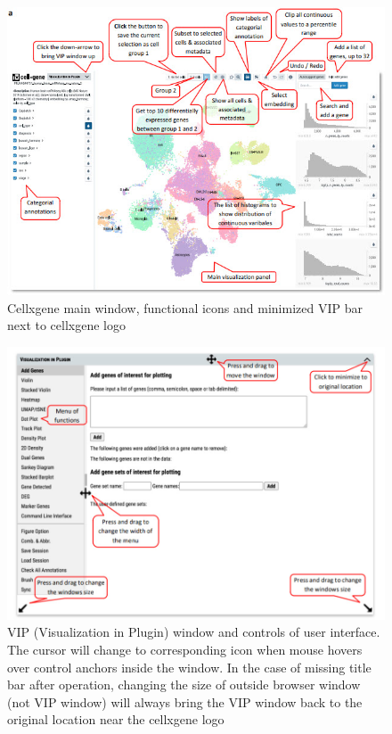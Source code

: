 \documentclass[
]{article}
\begin{document}
\begin{figure}
\centering
\includegraphics{figures/F1A.jpg}
\caption{Cellxgene main window, functional icons and minimized VIP bar next to cellxgene logo}
\end{figure}

\begin{figure}
\centering
\includegraphics{figures/F1B.jpg}
\caption{VIP (Visualization in Plugin) window and controls of user interface. The cursor will change to corresponding icon when mouse hovers over control anchors inside the window. In the case of missing title bar after operation, changing the size of outside browser window (not VIP window) will always bring the VIP window back to the original location near the cellxgene logo}
\end{figure}
\end{document}
